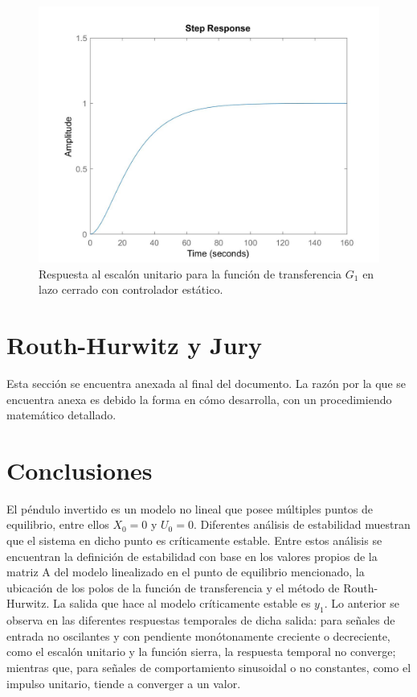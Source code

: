\documentclass[journal]{IEEEtran}
\begin{document}
\begin{figure}[h!]
\caption{Respuesta al escalón unitario para la función de transferencia $G_1$ en lazo cerrado con controlador estático.\label{fig:stepGc1}}
  \centering
\includegraphics[scale=0.18]{control/step_Gc1.jpg}
\end{figure}
\vspace{20pt}
\section{Routh-Hurwitz y Jury}
Esta sección se encuentra anexada al final del documento. La razón por la que se encuentra anexa es debido la forma en cómo desarrolla, con un procedimiendo matemático detallado.

\section{Conclusiones}
El péndulo invertido es un modelo no lineal que posee múltiples puntos de equilibrio, entre ellos $X_0=0$ y $U_0=0$. Diferentes análisis de estabilidad muestran que el sistema en dicho punto es críticamente estable. Entre estos análisis se encuentran la definición de estabilidad con base en los valores propios de la matriz A del modelo linealizado en el punto de equilibrio mencionado, la ubicación de los polos de la función de transferencia y el método de Routh-Hurwitz. La salida que hace al modelo críticamente estable es $y_1$. Lo anterior se observa en las diferentes respuestas temporales de dicha salida: para señales de entrada no oscilantes y con pendiente monótonamente creciente o decreciente, como el escalón unitario y la función sierra, la respuesta temporal no converge; mientras que, para señales de comportamiento sinusoidal o no constantes, como el impulso unitario, tiende a converger a un valor.\\
\end{document}
